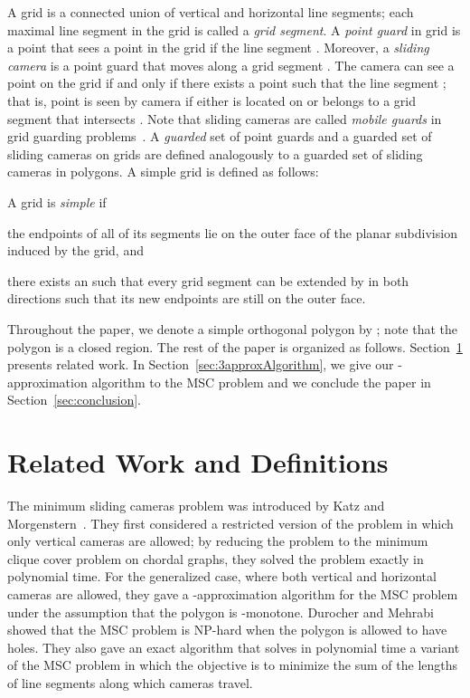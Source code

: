 \documentclass{llncs}
\begin{document}
A grid  is a connected union of vertical and horizontal line segments;
each maximal line segment in the grid is called a \emph{grid segment}. A \emph{point guard} 
in grid  is a point that sees a point  in the grid if the
line segment . Moreover, a \emph{sliding camera}
 is a point guard that moves along a grid
segment . The camera  can see a point  on the grid if and
only if there exists a point  such that the line segment
; that is, point  is seen by camera  if
either  is located on  or  belongs to a grid segment that
intersects . Note that sliding cameras are called \emph{mobile guards} in
grid guarding problems~\cite{kosowski2004,adrian2006}. A \emph{guarded} set of point guards and a guarded set of sliding cameras on grids
are defined analogously to a guarded set of sliding cameras in polygons. A simple grid is defined as follows:

\begin{definition}
A grid is \emph{simple} if \begin{inparaenum}[(i)]\item the
endpoints of all of its segments lie on the outer face of the planar
subdivision induced by the grid, and
\item there exists an  such that every grid segment can
be extended by  in both directions such that its new
endpoints are still on the outer face. \end{inparaenum}
\end{definition}

Throughout the paper, we denote a simple orthogonal polygon by ; note that the
polygon  is a closed region.
The rest of the paper is organized as follows. Section~\ref{sec:relatedWork} presents
related work. In Section~\ref{sec:3approxAlgorithm}, we give our -approximation
algorithm to the MSC problem and we conclude the paper in Section~\ref{sec:conclusion}.

\section{Related Work and Definitions}
\label{sec:relatedWork}
The minimum sliding cameras problem was introduced by Katz and Morgenstern~\cite{katz2011}.
They first considered a restricted version of the problem in which only vertical cameras are allowed; by reducing
the problem to the minimum clique cover problem on chordal graphs, they solved the problem exactly
in polynomial time. For the generalized case, where both vertical and horizontal cameras are allowed,
they gave a -approximation algorithm for the MSC problem under the assumption that the polygon 
is -monotone. 
Durocher and Mehrabi~\cite{durocher2013} showed that the MSC
problem is \textsc{NP}-hard when the polygon  is allowed to have holes. They also gave an exact algorithm
that solves in polynomial time a variant of the MSC problem in which the objective is to minimize the sum of the lengths of line
segments along which cameras travel.
\end{document}
